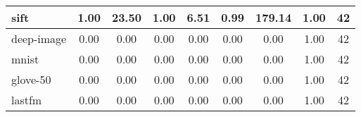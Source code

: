 \begin{table*}[!t]
\begin{center}
\begin{small}
\begin{sc}
\begin{tabular}{|l|c|c|c|c|c|c|c|c|}
    \hline
    sift                  & 1.00 &  23.50                          & 1.00 & 6.51                                  & 0.99 & 179.14                                                    & 1.00 & 42 \\
    \hline
    deep-image             & 0.00 & 0.00                           & 0.00 & 0.00                                & 0.00 & 0.00                                                    & 1.00 & 42 \\
    \hline
    mnist                   & 0.00 & 0.00                          & 0.00 & 0.00                                  & 0.00 & 0.00                                                    & 1.00 & 42 \\
    \hline
    glove-50               & 0.00 & 0.00                           & 0.00 & 0.00                              & 0.00 & 0.00                                                    & 1.00 & 42 \\
    \hline
    lastfm                 & 0.00 & 0.00                           & 0.00 & 0.00                             & 0.00 & 0.00                                                    & 1.00 & 42 \\
    \hline
    \end{tabular}
    \end{sc}
    \end{small}
    \end{center}
    \vskip -0.1in
    \end{table*}
    